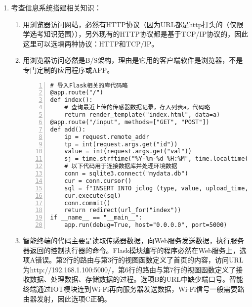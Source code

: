 \begin{enumerate}
\item 考查信息系统搭建相关知识：
	\begin{enumerate}[label=$(\arabic*)$]
	\item 用浏览器访问网站，必然有HTTP协议（因为URL都是http打头的（仅限学选考知识范围）），另外现有的HTTP协议都是基于TCP/IP协议的，因此这里可以选填两种协议：HTTP和TCP/IP。
	\item 用浏览器访问必然是B/S架构，理由是它用的客户端软件是浏览器，不是专门定制的应用程序或APP。
\begin{lstlisting}[numbers=left]
# 导入Flask相关的库代码略
@app.route("/")
def index():
    # 查询最近上传的传感器数据记录，存入列表a，代码略
    return render_template("index.html", data=a)
@app.route("/input", methods=["GET", "POST"])
def add():
    ip = request.remote_addr
    tp = int(request.args.get("id"))
    value = int(request.args.get("val"))
    sj = time.strftime("%Y-%m-%d %H:%M", time.localtime(time.time()))
    # 以下代码用于连接数据库并处理环境数据
    conn = sqlite3.connect("mydata.db")
    cur = conn.cursor()
    sql = f"INSERT INTO jclog (type, value, upload_time, ip) VALUES ({tp}, {value}, '{sj}', '{ip}')"
    cur.execute(sql)
    conn.commit()
    return redirect(url_for("index"))
if __name__ == "__main__":
    app.run(debug=True, host="0.0.0.0", port=5000)
\end{lstlisting}
	\item 智能终端的代码主要是读取传感器数据，向Web服务发送数据，执行服务器返回的控制执行器的命令。Flask模块编写的程序必然在Web服务上，选项A错误。第2行的路由与第3行的视图函数定义了首页的内容，访问URL为http://192.168.1.100:5000/，第6行的路由与第7行的视图函数定义了接收数据、处理数据、存储数据的过程。选项B的URL中缺少端口号。智能终端通过IOT模块连到Wi-Fi再向服务器发送数据，Wi-Fi信号一般需要路由器发射，因此选项C正确。
	\end{enumerate}


\end{enumerate}


\newpage
